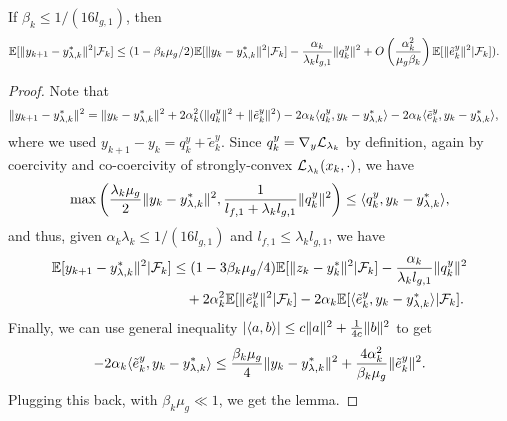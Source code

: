 \begin{lemma}
    \label{lemma:y_descent_2}
    If $\beta_k \le 1 / (16 l_{g,1})$, then
    \begin{align*}
        \mathbb{E}[\|y_{k+1} - y_{\lambda,k}^*\|^2 | \mathcal{F}_k] &\le (1 - \beta_k \mu_g / 2) \mathbb{E}[\|y_{k} - y_{\lambda,k}^*\|^2 | \mathcal{F}_k] - \frac{\alpha_k}{\lambda_k l_{g,1}} \|q_k^y\|^2 + O\left(\frac{\alpha_k^2}{\mu_g \beta_k} \right) \mathbb{E}[\|\tilde{e}_k^y\|^2 | \mathcal{F}_k]). 
    \end{align*}
\end{lemma}
\begin{proof}
    Note that
    \begin{align*}
        \|y_{k+1} - y_{\lambda,k}^*\|^2 &= \|y_k - y_{\lambda,k}^*\|^2 + 2 \alpha_k^2 (\|q_k^y\|^2 + \|\tilde{e}_k^y\|^2) - 2\alpha_k \langle q_k^y, y_k - y_{\lambda,k}^* \rangle - 2\alpha_k \langle \tilde{e}_k^y, y_k - y_{\lambda,k}^* \rangle,
    \end{align*}
    where we used $y_{k+1} - y_k = q_k^y + \tilde{e}_k^y$. Since $q_k^y = \nabla_y \mathcal{L}_{\lambda_k}$ by definition, again by coercivity and co-coercivity of strongly-convex $\mathcal{L}_{\lambda_k}(x_k, \cdot)$, we have
    \begin{align*}
        \max \left( \frac{\lambda_k \mu_g}{2} \|y_k - y_{\lambda,k}^*\|^2, \frac{1}{l_{f,1} + \lambda_k l_{g,1}} \|q_k^y\|^2 \right) \le \langle q_k^y, y_k - y_{\lambda,k}^* \rangle,  
    \end{align*}
    and thus, given $\alpha_k \lambda_k \le 1/(16 l_{g,1})$ and $l_{f,1} \le \lambda_k l_{g,1}$, we have
    \begin{align*}
        \mathbb{E}[y_{k+1} - y_{\lambda,k}^*\|^2 | \mathcal{F}_k] &\le (1 - 3 \beta_k \mu_g/4) \mathbb{E}[\|z_k - y_k^*\|^2 | \mathcal{F}_k] - \frac{\alpha_k}{\lambda_k l_{g,1}} \|q_k^y\|^2 \\
        &\quad + 2\alpha_k^2 \mathbb{E}[\|\tilde{e}_k^y\|^2 | \mathcal{F}_k] - 2\alpha_k \mathbb{E}[\langle \tilde{e}_k^y, y_k - y_{\lambda,k}^* \rangle | \mathcal{F}_k].
    \end{align*}
    Finally, we can use general inequality $|\langle a, b \rangle| \le c\|a\|^2 + \frac{1}{4c} \|b\|^2$ to get
    \begin{align*}
        -2\alpha_k \langle \tilde{e}_k^y, y_k - y_{\lambda,k}^* \rangle \le \frac{\beta_k \mu_g}{4} \|y_k - y_{\lambda,k}^*\|^2 + \frac{4\alpha_k^2}{\beta_k \mu_g} \|\tilde{e}_k^y\|^2. 
    \end{align*}
    Plugging this back, with $\beta_k \mu_g \ll 1$, we get the lemma. 
\end{proof}




